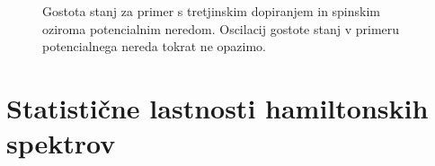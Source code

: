  \begin{figure}[H]
\caption{Gostota stanj za primer s tretjinskim dopiranjem in spinskim oziroma potencialnim neredom. Oscilacij gostote stanj v primeru potencialnega nereda tokrat ne opazimo. }
\label{fig:DOS_spin_hole_disorder_12_4_4.pdf}
\end{figure}

\chapter{Statistične lastnosti hamiltonskih spektrov}
\label{statisticne_lastnosti}
